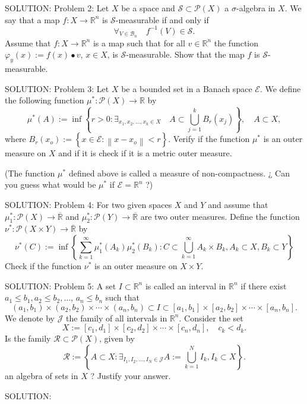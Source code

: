 \documentclass[10pt]{article}
\begin{document}
SOLUTION: Problem 2: Let $X$ be a space and $\mathscr{S} \subset \mathscr{P}(X)$ a $\sigma$-algebra in $X$. We say that a map $f: X \rightarrow \mathbb{R}^{n}$ is $\mathscr{S}$-measurable if and only if
$$
\forall_{V \in \mathscr{B}_{n}} \quad f^{-1}(V) \in \mathscr{S} .
$$
Assume that $f: X \rightarrow \mathbb{R}^{n}$ is a map such that for all $v \in \mathbb{R}^{n}$ the function $\varphi_{y}(x):=f(x) \bullet v$, $x \in X$, is $\mathscr{S}$-measurable. Show that the map $f$ is $\mathscr{S}$-measurable.

SOLUTION: Problem 3: Let $X$ be a bounded set in a Banach space $\mathscr{E}$. We define the following function $\mu^{*}: \mathscr{P}(X) \rightarrow \mathbb{R}$ by
$$
\mu^{*}(A):=\inf \left\{r>0: \exists_{x_{1}, x_{2}, \ldots, x_{k} \in X} \quad A \subset \bigcup_{j=1}^{k} B_{r}\left(x_{j}\right)\right\}, \quad A \subset X,
$$
where $B_{r}\left(x_{o}\right):=\left\{x \in \mathscr{E}:\left\|x-x_{o}\right\|<r\right\}$. Verify if the function $\mu^{*}$ is an outer measure on $X$ and if it is check if it is a metric outer measure.

(The function $\mu^{*}$ defined above is called a measure of non-compactness. ¿ Can you guess what would be $\mu^{*}$ if $\mathscr{E}=\mathbb{R}^{n}$ ?)

SOLUTION: Problem 4: For two given spaces $X$ and $Y$ and assume that $\mu_{1}^{*}: \mathscr{P}(X) \rightarrow \overline{\mathbb{R}}$ and $\mu_{2}^{*}: \mathscr{P}(Y) \rightarrow \overline{\mathbb{R}}$ are two outer measures. Define the function $\nu^{*}: \mathscr{P}(X \times Y) \rightarrow \overline{\mathbb{R}}$ by
$$
\nu^{*}(C):=\inf \left\{\sum_{k=1}^{\infty} \mu_{1}^{*}\left(A_{k}\right) \mu_{2}^{*}\left(B_{k}\right): C \subset \bigcup_{k=1}^{\infty} A_{k} \times B_{k}, A_{k} \subset X, B_{k} \subset Y\right\}
$$
Check if the function $\nu^{*}$ is an outer measure on $X \times Y$.

SOLUTION: Problem 5: A set $I \subset \mathbb{R}^{n}$ is called an interval in $\mathbb{R}^{n}$ if there exist $a_{1} \leq b_{1}, a_{2} \leq b_{2}, \ldots$, $a_{n} \leq b_{n}$ such that
$$
\left(a_{1}, b_{1}\right) \times\left(a_{2}, b_{2}\right) \times \cdots \times\left(a_{n}, b_{n}\right) \subset I \subset\left[a_{1}, b_{1}\right] \times\left[a_{2}, b_{2}\right] \times \cdots \times\left[a_{n}, b_{n}\right] .
$$
We denote by $\mathscr{J}$ the family of all intervals in $\mathbb{R}^{n}$. Consider the set
$$
X:=\left[c_{1}, d_{1}\right] \times\left[c_{2}, d_{2}\right] \times \cdots \times\left[c_{n}, d_{n}\right], \quad c_{k}<d_{k} .
$$
Is the family $\mathscr{R} \subset \mathscr{P}(X)$, given by
$$
\mathscr{R}:=\left\{A \subset X: \exists_{I_{1}, I_{2}, \ldots, I_{N} \in \mathscr{J}} A:=\bigcup_{k=1}^{N} I_{k}, I_{k} \subset X\right\} .
$$
an algebra of sets in $X$ ? Justify your answer.

SOLUTION:
\end{document}
